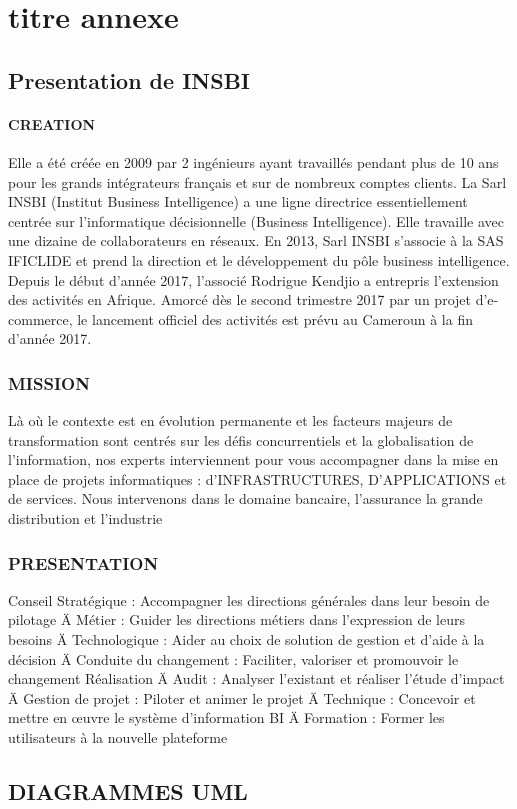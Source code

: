 \chapter{titre annexe}

\section{Presentation de INSBI}
	\subsubsection{CREATION}
	
Elle a été créée en 2009 par 2 ingénieurs ayant travaillés pendant plus de 10 ans pour les grands intégrateurs français et sur de nombreux comptes clients. La Sarl INSBI (Institut Business Intelligence) a une ligne directrice essentiellement centrée sur l’informatique décisionnelle (Business Intelligence). Elle travaille avec une dizaine de collaborateurs en réseaux. 
En 2013, Sarl INSBI s’associe à la SAS IFICLIDE et prend la direction et le développement du pôle business intelligence. Depuis le début d’année 2017, l’associé Rodrigue Kendjio a entrepris l’extension des activités en Afrique. Amorcé dès le second trimestre 2017 par un projet d’e-commerce, le lancement officiel des activités est prévu au Cameroun à la fin d’année 2017.

 \subsection{MISSION}
Là où le contexte est en évolution permanente et les facteurs majeurs de transformation sont centrés sur les défis concurrentiels et la globalisation de l’information, nos experts interviennent pour vous accompagner dans la mise en place de projets informatiques : d’INFRASTRUCTURES, D’APPLICATIONS et de services.
Nous intervenons dans le domaine bancaire, l’assurance la grande distribution et l’industrie

 \subsection{PRESENTATION}
Conseil
	 Stratégique : Accompagner les directions générales dans leur besoin de pilotage
	Ä  Métier : Guider les directions métiers dans l’expression de leurs besoins
	Ä  Technologique : Aider au choix de solution de gestion et d’aide à la décision
	Ä  Conduite du changement : Faciliter, valoriser et promouvoir le changement
Réalisation
	Ä  Audit : Analyser l’existant et réaliser l’étude d’impact
	Ä  Gestion de projet : Piloter et animer le projet
	Ä  Technique : Concevoir et mettre en œuvre le système d’information BI
Ä  Formation : Former les utilisateurs à la nouvelle plateforme

\section{DIAGRAMMES UML}
	